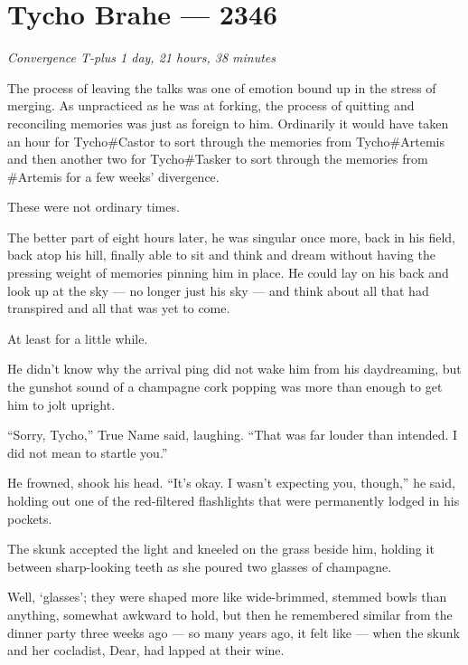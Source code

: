 \hypertarget{tycho-brahe-2346}{%
\chapter{Tycho Brahe — 2346}\label{tycho-brahe-2346}}

\begin{center}
\emph{Convergence T-plus 1 day, 21 hours, 38 minutes}
\end{center}

\noindent The process of leaving the talks was one of emotion bound up in the stress of merging. As unpracticed as he was at forking, the process of quitting and reconciling memories was just as foreign to him. Ordinarily it would have taken an hour for Tycho\#Castor to sort through the memories from Tycho\#Artemis and then another two for Tycho\#Tasker to sort through the memories from \#Artemis for a few weeks' divergence.

These were not ordinary times.

The better part of eight hours later, he was singular once more, back in his field, back atop his hill, finally able to sit and think and dream without having the pressing weight of memories pinning him in place. He could lay on his back and look up at the sky — no longer just his sky — and think about all that had transpired and all that was yet to come.

At least for a little while.

He didn't know why the arrival ping did not wake him from his daydreaming, but the gunshot sound of a champagne cork popping was more than enough to get him to jolt upright.

``Sorry, Tycho,'' True Name said, laughing. ``That was far louder than intended. I did not mean to startle you.''

He frowned, shook his head. ``It's okay. I wasn't expecting you, though,'' he said, holding out one of the red-filtered flashlights that were permanently lodged in his pockets.

The skunk accepted the light and kneeled on the grass beside him, holding it between sharp-looking teeth as she poured two glasses of champagne.

Well, `glasses'; they were shaped more like wide-brimmed, stemmed bowls than anything, somewhat awkward to hold, but then he remembered similar from the dinner party three weeks ago — so many years ago, it felt like — when the skunk and her cocladist, Dear, had lapped at their wine.

